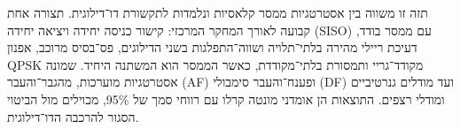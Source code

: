 \begin{otherlanguage}{hebrew}
\begin{justify}
\begin{flushright}


תזה זו משווה בין אסטרטגיות ממסר קלאסיות ונלמדות לתקשורת דו־דילוגית. תצורה אחת קבועה לאורך המחקר המרכזי: קישור כניסה יחידה ויציאה יחידה (SISO) עם ממסר בודד, דעיכת ריילי מהירה בלתי־תלויה ושווה־התפלגות בשני הדילוגים, פס־בסיס מרוכב, אפנון QPSK מקודד־גריי ותמסורת בלתי־מקודדת, כאשר הממסר הוא המשתנה היחיד. שמונה אסטרטגיות מוערכות, מהגבר־והעבר (AF) ופענח־והעבר סימבולי (DF) ועד מודלים גנרטיביים ומודלי רצפים. התוצאות הן אומדני מונטה קרלו עם רווחי סמך של 95\%, מכוילים מול הביטוי הסגור להרכבה הדו־דילוגית.


\end{flushright}
\end{justify}
\end{otherlanguage}
